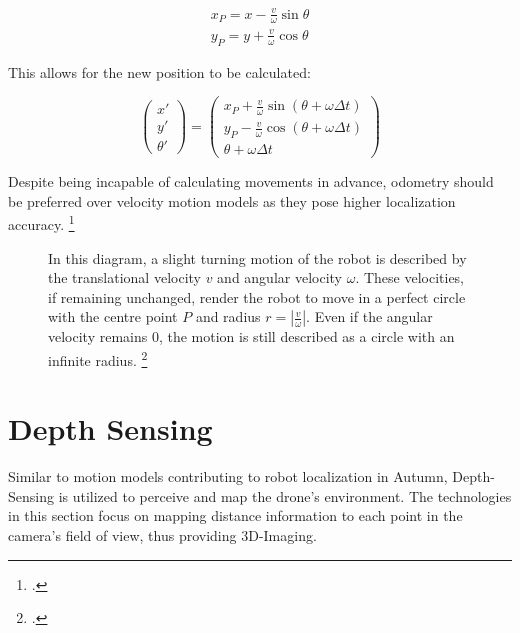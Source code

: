 \begin{equation}
	\begin{split}
		x_{P} = x - \frac{v}{\omega} \sin \theta \\
		y_{P} = y + \frac{v}{\omega} \cos \theta
	\end{split}
\end{equation}

This allows for the new position to be calculated: 

\begin{equation}
	\begin{pmatrix}
		x' \\
		y' \\
		\theta'
	\end{pmatrix}
	=
	\begin{pmatrix}
		x_{P} + \frac{v}{\omega} \sin(\theta + \omega \Delta t) \\
		y_{P} - \frac{v}{\omega} \cos(\theta + \omega \Delta t) \\
		\theta + \omega \Delta t
	\end{pmatrix}
\end{equation}

Despite being incapable of calculating movements in advance, odometry should be preferred over velocity motion models as they pose higher localization accuracy. \footcite[Page 107]{thrun2002probabilisticRobotics}

\begin{figure}
	\centering
	
	\caption{
		In this diagram, a slight turning motion of the robot is described by the translational velocity $v$ and angular velocity $\omega$. These velocities, if remaining unchanged, render the robot to move in a perfect circle with the centre point $P$ and radius $r = | \frac{v}{\omega}|$. Even if the angular velocity remains 0, the motion is still described as a circle with an infinite radius. \footcite[Pages 95 - 107]{thrun2002probabilisticRobotics}
	}
	\label{fig:inertial}
\end{figure}



\section{Depth Sensing}
Similar to motion models contributing to robot localization in Autumn, Depth-Sensing is utilized to perceive and map the drone's environment. 
The technologies in this section focus on mapping distance information to each point in the camera's field of view, thus providing 3D-Imaging.

